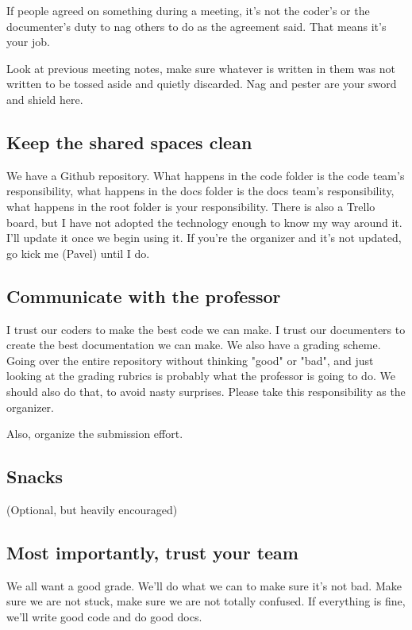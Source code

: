 \documentclass{article}
\begin{document}
If people agreed on something during a meeting, it's not the coder's or the documenter's duty to nag others to do as the agreement said. That means it's your job.


Look at previous meeting notes, make sure whatever is written in them was not written to be tossed aside and quietly discarded. Nag and pester are your sword and shield here.


\subsection{Keep the shared spaces clean}


We have a Github repository. What happens in the code folder is the code team's responsibility, what happens in the docs folder is the docs team's responsibility, what happens in the root folder is your responsibility. There is also a Trello board, but I have not adopted the technology enough to know my way around it. I'll update it once we begin using it. If you're the organizer and it's not updated, go kick me (Pavel) until I do.

\subsection{Communicate with the professor}


I trust our coders to make the best code we can make. I trust our documenters to create the best documentation we can make. We also have a grading scheme. Going over the entire repository without thinking "good" or "bad", and just looking at the grading rubrics is probably what the professor is going to do. We should also do that, to avoid nasty surprises. Please take this responsibility as the organizer.


Also, organize the submission effort.


\subsection{Snacks}


(Optional, but heavily encouraged)


\subsection{Most importantly, trust your team}


We all want a good grade. We'll do what we can to make sure it's not bad. Make sure we are not stuck, make sure we are not totally confused. If everything is fine, we'll write good code and do good docs.
\end{document}
